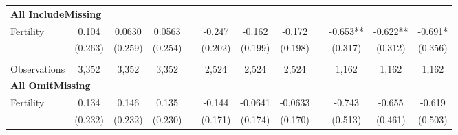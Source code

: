 \begin{landscape}
\begin{table}[htpb!]
\begin{center}
\begin{tabular}{lcccp{2mm}cccp{2mm}ccc}
\multicolumn{12}{l}{\textbf{All IncludeMissing}}\\ 
Fertility&0.104&0.0630&0.0563&&-0.247&-0.162&-0.172&&-0.653**&-0.622**&-0.691*\\
&(0.263)&(0.259)&(0.254)&&(0.202)&(0.199)&(0.198)&&(0.317)&(0.312)&(0.356)\\
\begin{footnotesize}\end{footnotesize}&\begin{footnotesize}\end{footnotesize}&\begin{footnotesize}\end{footnotesize}&\begin{footnotesize}\end{footnotesize}&\begin{footnotesize}\end{footnotesize}&\begin{footnotesize}\end{footnotesize}&\begin{footnotesize}\end{footnotesize}&\begin{footnotesize}\end{footnotesize}&\begin{footnotesize}\end{footnotesize}&\begin{footnotesize}\end{footnotesize}&\begin{footnotesize}\end{footnotesize}&\begin{footnotesize}\end{footnotesize}\\Observations&3,352&3,352&3,352&&2,524&2,524&2,524&&1,162&1,162&1,162\\
\multicolumn{12}{l}{\textbf{All OmitMissing}}\\ 
Fertility&0.134&0.146&0.135&&-0.144&-0.0641&-0.0633&&-0.743&-0.655&-0.619\\
&(0.232)&(0.232)&(0.230)&&(0.171)&(0.174)&(0.170)&&(0.513)&(0.461)&(0.503)\\

\end{tabular}
\end{center}
\end{table}
\end{landscape}
